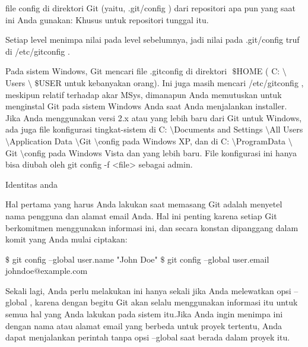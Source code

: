 \vspace{12pt}
\noindent 
file $  $config $  $di direktori Git (yaitu, $  $.git/config $  $) dari repositori apa pun yang saat ini Anda gunakan: Khusus untuk repositori tunggal itu. \par
\vspace{12pt}
\noindent 
Setiap level menimpa nilai pada level sebelumnya, jadi nilai pada $  $.git/config $  $truf di $  $/etc/gitconfig $  $. \par
\vspace{12pt}
\noindent 
Pada sistem Windows, Git mencari file $  $.gitconfig $  $di direktori $  $ $  \$  $HOME $  $( $  $C: $  \setminus  $Users $  \setminus  $ $  \$  $USER $  $untuk kebanyakan orang). $  $Ini juga masih mencari $  $/etc/gitconfig $  $, meskipun relatif terhadap akar MSys, dimanapun Anda memutuskan untuk menginstal Git pada sistem Windows Anda saat Anda menjalankan installer. $  $Jika Anda menggunakan versi 2.x atau yang lebih baru dari Git untuk Windows, ada juga file konfigurasi tingkat-sistem di $  $C: $  \setminus  $Documents and Settings $  \setminus  $All Users $  \setminus  $Application Data $  \setminus  $Git $  \setminus  $config $  $pada Windows XP, dan di $  $C: $  \setminus  $ProgramData $  \setminus  $Git $  \setminus  $config $  $pada Windows Vista dan yang lebih baru. $  $File konfigurasi ini hanya bisa diubah oleh $  $git config -f <file> $  $sebagai admin. \par
\vspace{12pt}
\noindent 
Identitas anda \par
\vspace{12pt}
\noindent 
Hal pertama yang harus Anda lakukan saat memasang Git adalah menyetel nama pengguna dan alamat email Anda. $  $Hal ini penting karena setiap Git berkomitmen menggunakan informasi ini, dan secara konstan dipanggang dalam komit yang Anda mulai ciptakan: \par
\vspace{12pt}
\noindent 
  $  \$  $ git config --global user.name "John Doe"  $  \$  $ git config --global user.email johndoe@example.com \par
\vspace{12pt}
\noindent 
Sekali lagi, Anda perlu melakukan ini hanya sekali jika Anda melewatkan opsi $  $--global $  $, karena dengan begitu Git akan selalu menggunakan informasi itu untuk semua hal yang Anda lakukan pada sistem itu.Jika Anda ingin menimpa ini dengan nama atau alamat email yang berbeda untuk proyek tertentu, Anda dapat menjalankan perintah tanpa opsi $  $--global $  $saat berada dalam proyek itu. \par
